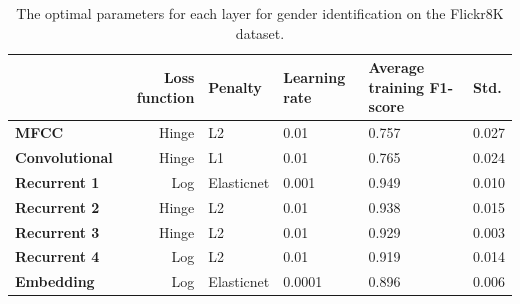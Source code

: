 \documentclass[a4paper, oneside]{book}
\begin{document}
\begin{table}[H]
\begin{center}
\begin{tabular}{|l|r|l|l|l|l|}
\hline              & \bf Loss function  & \bf Penalty  & \bf Learning rate & \bf Average training F1-score & \bf Std. \\ \hline
\bf MFCC            & Hinge              & L2           & 0.01              &  0.757                        & 0.027 \\
\bf Convolutional   & Hinge              & L1           & 0.01              &  0.765                        & 0.024 \\ 
\bf Recurrent 1     & Log                & Elasticnet   & 0.001             &  0.949                        & 0.010 \\
\bf Recurrent 2     & Hinge              & L2           & 0.01              &  0.938                        & 0.015 \\
\bf Recurrent 3     & Hinge              & L2           & 0.01              &  0.929                        & 0.003 \\
\bf Recurrent 4     & Log                & L2           & 0.01              &  0.919                        & 0.014 \\
\bf Embedding       & Log                & Elasticnet   & 0.0001            &  0.896                        & 0.006 \\
\hline
\end{tabular}
\end{center}
\caption{\label{table:gender-identification-on-flickr8k-dataset} The optimal parameters for each layer for gender identification on the Flickr8K dataset.  }
\end{table}
\end{document}
